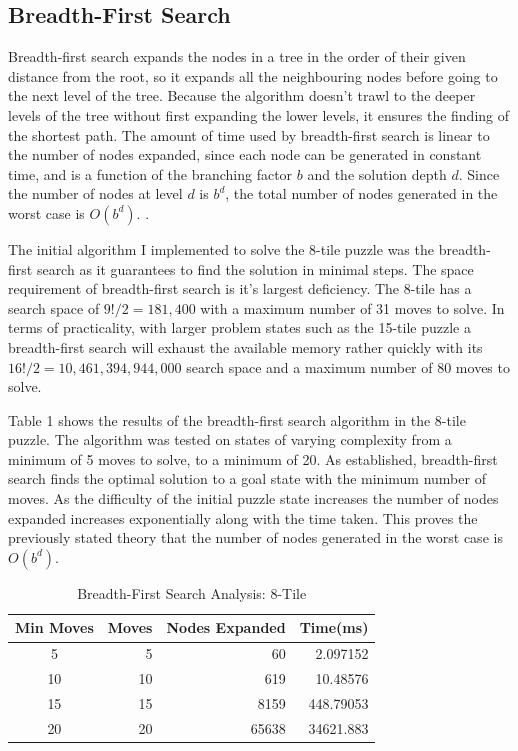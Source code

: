 \documentclass[progress]{cmpreport}
\begin{document}
\subsection{Breadth-First Search}
Breadth-first search expands the nodes in a tree in the order of their given distance from the root, so it expands all the neighbouring nodes before going to the next level of the tree. Because the algorithm doesn't trawl to the deeper levels of the tree without first expanding the lower levels, it ensures the finding of the shortest path. The amount of time used by breadth-first search is linear to the number of nodes expanded, since each node can be generated in constant time, and is a function of the branching factor $b$ and the solution depth $d$. Since the number of nodes at level $d$ is $b^d$, the total number of nodes generated in the worst case is $O(b^d)$. \citep{DBLP:journals/mima/Korf95}.

The initial algorithm I implemented to solve the 8-tile puzzle was the breadth-first search as it guarantees to find the solution in minimal steps. The space requirement of breadth-first search is it's largest deficiency. The 8-tile has a search space of $9!/2=181,400$ with a maximum number of 31 moves to solve. In terms of practicality, with larger problem states such as the 15-tile puzzle a breadth-first search will exhaust the available memory rather quickly with its $16!/2 = 10,461,394,944,000$ search space and a maximum number of 80 moves to solve.

Table 1 shows the results of the breadth-first search algorithm in the 8-tile puzzle. The algorithm was tested on states of varying complexity from a minimum of 5 moves to solve, to  a minimum of 20. As established, breadth-first search finds the optimal solution to a goal state with the minimum number of moves. As the difficulty of the initial puzzle state increases the number of nodes expanded increases exponentially along with the time taken. This proves the previously stated theory that the number of nodes generated in the worst case is $O(b^d)$.


\begin{table}[ht]
	\caption{Breadth-First Search Analysis: 8-Tile}
	\begin{center}
		\begin{tabular}{crrr} \hline
			Min Moves & Moves & Nodes Expanded &Time(ms)  \\ \hline
			5  & 5 & 60& 2.097152 \\
			10 & 10 &619&  10.48576 \\ 
		    15 & 15 & 8159& 448.79053 \\ 
	    	20 & 20& 65638 & 34621.883 \\ \hline
		\end{tabular}
	\end{center}
\end{table}
\end{document}
